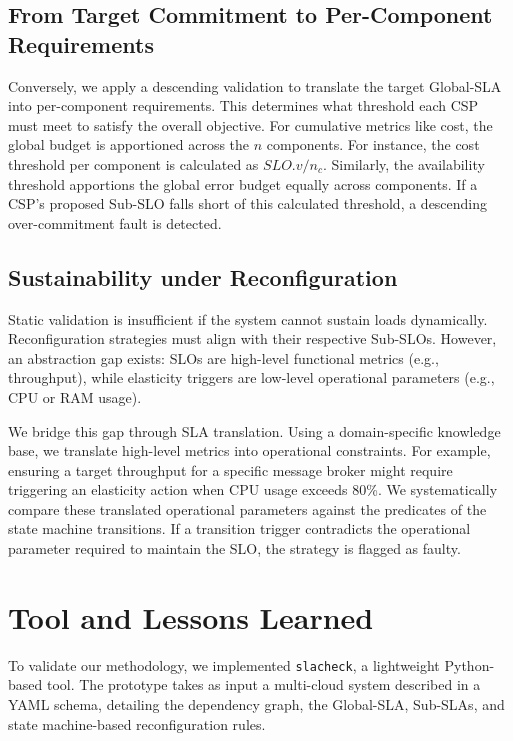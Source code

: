 \documentclass[conference]{IEEEtran}
\begin{document}
\subsection{From Target Commitment to Per-Component Requirements}\label{sec:thresholds}
Conversely, we apply a descending validation to translate the target Global-SLA into per-component requirements. This determines what threshold each CSP must meet to satisfy the overall objective. For cumulative metrics like cost, the global budget is apportioned across the $n$ components. For instance, the cost threshold per component is calculated as $SLO.v / n_c$. Similarly, the availability threshold apportions the global error budget equally across components. If a CSP's proposed Sub-SLO falls short of this calculated threshold, a descending over-commitment fault is detected.

\subsection{Sustainability under Reconfiguration}\label{sec:translation}
Static validation is insufficient if the system cannot sustain loads dynamically. Reconfiguration strategies must align with their respective Sub-SLOs. However, an abstraction gap exists: SLOs are high-level functional metrics (e.g., throughput), while elasticity triggers are low-level operational parameters (e.g., CPU or RAM usage). 

We bridge this gap through SLA translation. Using a domain-specific knowledge base, we translate high-level metrics into operational constraints. For example, ensuring a target throughput for a specific message broker might require triggering an elasticity action when CPU usage exceeds 80\%. We systematically compare these translated operational parameters against the predicates of the state machine transitions. If a transition trigger contradicts the operational parameter required to maintain the SLO, the strategy is flagged as faulty.

\section{Tool and Lessons Learned}\label{sec:tool}

To validate our methodology, we implemented \texttt{slacheck}, a lightweight Python-based tool. The prototype takes as input a multi-cloud system described in a YAML schema, detailing the dependency graph, the Global-SLA, Sub-SLAs, and state machine-based reconfiguration rules. 
\end{document}
